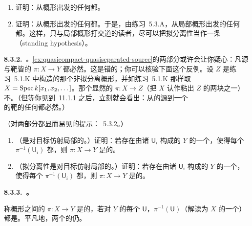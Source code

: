 \begin{exercise}[容易的练习]\label{ex:quasicompact-quasiseparated-source}
\begin{enumerate}[label=(\alph*)]
\item 证明：从\trNoetherian{}概形出发的任何\trMorphism{}都\trQuasicompact。
\item 证明：从\trQuasiSeparated{}概形出发的任何\trMorphism{}都\trQuasiSeparated。于是，由练习~5.3.A，从局部\trNoetherian{}概形出发的任何\trMorphism{}都\trQuasiSeparated。这样，只与局部\trNoetherian{}概形打交道的读者，尽可以把拟分离性当作一条\trStandingHypothesis{}（standing hypothesis）。
\end{enumerate}
\end{exercise}

\textbf{8.3.2.}\ \emph{\trhCaveat{}。}\quad \cref{ex:quasicompact-quasiseparated-source}的两部分或许会让你疑心：凡源与靶皆\trQuasicompact{}的\trMorphism{} $\pi\colon X\to Y$ 都必然\trQuasicompact。这是错的；你可以核验下面这个反例。设 $Z$ 是练习~5.1.K 中构造的那个非拟分离概形，并如练习~5.1.K 那样取 $X=\operatorname{Spec} k[x_1,x_2,\dots]$。那个显然的\trOpenEmbedding{} $\pi\colon X\to Z$（把 $X$ 认作粘出 $Z$ 的两块之一）不\trQuasicompact。（但等你见到\trCancellationTheorem{}~11.1.1 之后，立刻就会看出：从\trQuasicompact{}的源到一个\emph{\trQuasiSeparated}的靶的任何\trMorphism{}都必然\trQuasicompact。）

\begin{exercise}\label{ex:quasicompact-quasiseparated-affine-local}
（对两部分都显而易见的提示：\trAffineCommunicationLemma{}~5.3.2。）
\begin{enumerate}[label=(\alph*)]
\item （\trQuasicompactness{}是对目标仿射局部的。）证明：若存在由诸\trAffine\trOpenSet{} $\mathsf{U}_i$ 构成的 $Y$ 的一个\trCover{}，使得每个 $\pi^{-1}(\mathsf{U}_i)$ 都\trQuasicompact，则\trMorphism{} $\pi\colon X\to Y$ 是\trQuasicompact{}的。
\item （拟分离性是对目标仿射局部的。）证明：若存在由诸\trAffine\trOpenSet{} $\mathsf{U}_i$ 构成的 $Y$ 的一个\trCover{}，使得每个 $\pi^{-1}(\mathsf{U}_i)$ 都\trQuasiSeparated，则\trMorphism{} $\pi\colon X\to Y$ 是\trQuasiSeparated{}的。
\end{enumerate}
\end{exercise}

\textbf{8.3.3.\ \trAffine\trMorphism。}

称概形之间的\trMorphism{} $\pi\colon X\to Y$ 是\textbf{\trAffine}的，若对 $Y$ 的每个\trAffine\trOpenSet{} $\mathsf{U}$，$\pi^{-1}(\mathsf{U})$（解读为 $X$ 的一个\trOpenSubscheme）都是\trAffineScheme。平凡地，两个\trAffine{}\trMorphism{}的\trComposition{}仍\trAffine。

